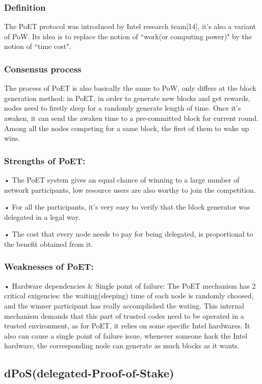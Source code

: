 \documentclass[doublespacing]{bmcart}
\begin{document}
\begin{CJK*}{UTF8}{gbsn}
\subsubsection*{Definition} 
The PoET protocol was introduced by Intel research team[14], it’s also a variant of PoW. Its idea is to replace the notion of ``work(or computing power)" by the notion of ``time cost".
	\subsubsection*{Consensus process}
	The process of PoET is also basically the same to PoW, only differs at the block generation method: in PoET, in order to generate new blocks and get rewards, nodes need to firstly sleep for a randomly generate length of time. Once it’s awaken, it can send the awaken time to a pre-committed block for current round. Among all the nodes competing for a same block, the first of them to wake up wins.
	\subsubsection*{Strengths of PoET:}	
    • The PoET system gives an equal chance of winning to a large number of network participants, low resource users are also worthy to join the competition.
    \par • For all the participants, it’s very easy to verify that the block generator was delegated in a legal way.
    \par • The cost that every node needs to pay for being delegated, is proportional to the benefit obtained from it.
\subsubsection*{Weaknesses of PoET:}
    • Hardware dependencies \& Single point of failure: The PoET mechanism has 2 critical exigencies: the waiting(sleeping) time of each node is randomly choosed, and the winner participant has really accomplished the wating. This internal mechanism demands that this part of trusted codes need to be operated in a trusted environment, as for PoET, it relies on some specific Intel hardwares. It also can cause a single point of failure issue, whenever someone hack the Intel hardware, the corresponding node can generate as much blocks as it wants.

\subsection{dPoS(delegated-Proof-of-Stake)}

\end{CJK*}
\end{document}
